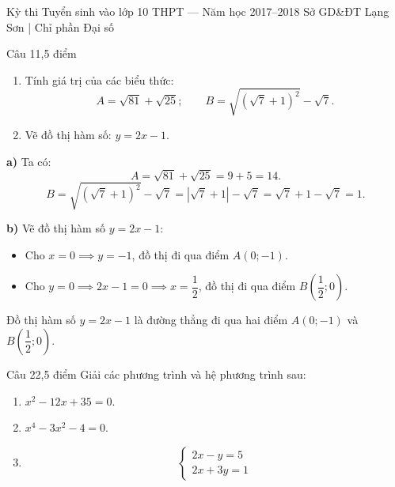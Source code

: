 ﻿%
%
  {Kỳ thi Tuyển sinh vào lớp 10 THPT — Năm học 2017--2018}%
  {Sở GD\&ĐT Lạng Sơn | Chỉ phần Đại số}

\begin{de_cau}{Câu 1}{1,5 điểm}
\begin{enumerate}[label=\alph*)]
\item Tính giá trị của các biểu thức:
\[A = \sqrt{81} + \sqrt{25};\qquad B = \sqrt{(\sqrt{7}+1)^2} - \sqrt{7}.\]
\item Vẽ đồ thị hàm số: $y = 2x - 1$.
\end{enumerate}
\end{de_cau}

\begin{loi_giai_cau}
\textbf{a)} Ta có:
\[A = \sqrt{81} + \sqrt{25} = 9 + 5 = \boxed{14}.\]
\[B = \sqrt{(\sqrt{7}+1)^2} - \sqrt{7} = |\sqrt{7}+1| - \sqrt{7} = \sqrt{7} + 1 - \sqrt{7} = \boxed{1}.\]

\textbf{b)} Vẽ đồ thị hàm số $y = 2x - 1$:
\begin{itemize}
\item Cho $x = 0 \implies y = -1$, đồ thị đi qua điểm $A(0; -1)$.
\item Cho $y = 0 \implies 2x - 1 = 0 \implies x = \dfrac{1}{2}$, đồ thị đi qua điểm $B\left(\dfrac{1}{2}; 0\right)$.
\end{itemize}
Đồ thị hàm số $y = 2x - 1$ là đường thẳng đi qua hai điểm $A(0; -1)$ và $B\left(\dfrac{1}{2}; 0\right)$.
\end{loi_giai_cau}

\begin{de_cau}{Câu 2}{2,5 điểm}
Giải các phương trình và hệ phương trình sau:
\begin{enumerate}[label=\alph*)]
\item $x^2 - 12x + 35 = 0$.
\item $x^4 - 3x^2 - 4 = 0$.
\item 
\[ \begin{cases} 2x - y = 5 \\ 2x + 3y = 1 \end{cases} \]
\end{enumerate}
\end{de_cau}

